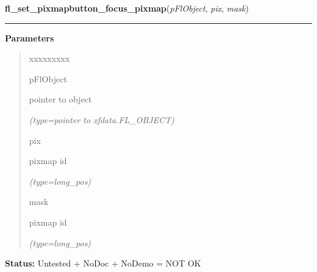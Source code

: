 \hspace{.8\funcindent}\begin{boxedminipage}{\funcwidth}

    \raggedright \textbf{fl\_set\_pixmapbutton\_focus\_pixmap}(\textit{pFlObject}, \textit{pix}, \textit{mask})

    \vspace{-1.5ex}

    \rule{\textwidth}{0.5\fboxrule}
\setlength{\parskip}{2ex}
\setlength{\parskip}{1ex}
      \textbf{Parameters}
      \vspace{-1ex}

      \begin{quote}
        \begin{Ventry}{xxxxxxxxx}

          \item[pFlObject]

          pointer to object

            {\it (type=pointer to xfdata.FL\_OBJECT)}

          \item[pix]

          pixmap id

            {\it (type=long\_pos)}

          \item[mask]

          pixmap id

            {\it (type=long\_pos)}

        \end{Ventry}

      \end{quote}

\textbf{Status:} Untested + NoDoc + NoDemo = NOT OK



    \end{boxedminipage}

    \label{xformslib:flbutton:fl_get_button}

    \vspace{0.5ex}

